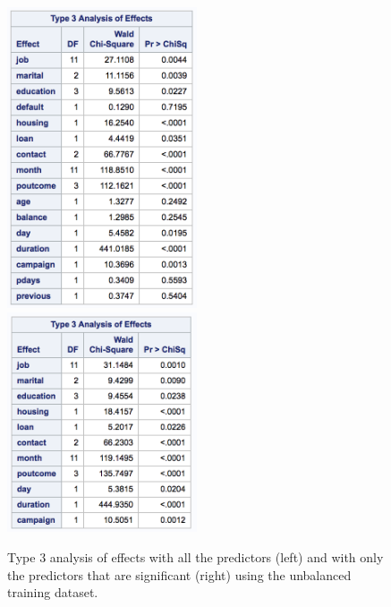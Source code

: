 \documentclass[]{article}
\begin{document}
\begin{figure}
  \centering
    \includegraphics[width=0.5\textwidth]{images/fig24a_typeIII.png} 
    \includegraphics[width=0.5\textwidth]{images/fig24b_typeIII.png}
  \caption{Type 3 analysis of effects with all the predictors (left) and with only the predictors that are significant (right) using the unbalanced training dataset.}
  \label{fig24}
\end{figure}
\end{document}
